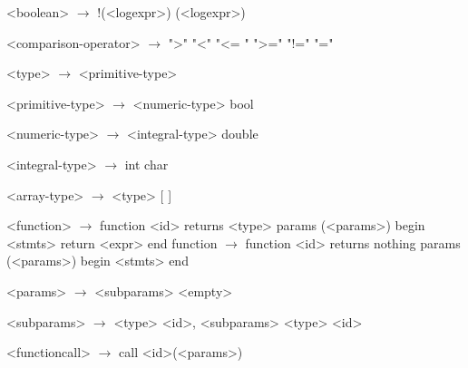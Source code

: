 \documentclass{article}
\begin{document}
\begin{grammar}
<boolean> $\rightarrow$ !(<logexpr>)
		\alt (<logexpr>)

<comparison-operator> $\rightarrow$ ">"
				\alt "<"
				\alt "<= "
				\alt ">="
				\alt "!="
				\alt "="

<type> $\rightarrow$ <primitive-type>

<primitive-type> $\rightarrow$ <numeric-type>
\alt bool

<numeric-type> $\rightarrow$ <integral-type>
\alt double

<integral-type> $\rightarrow$ int
\alt char

<array-type> $\rightarrow$ <type> [ ]

<function> $\rightarrow$  function <id> returns <type> params (<params>)
begin
	<stmts>
	return <expr>
end
\alt function $\rightarrow$ function <id> returns nothing params (<params>)
begin
	<stmts>
end

<params> $\rightarrow$ <subparams>
	\alt <empty>

<subparams> $\rightarrow$ <type> <id>, <subparams>
\alt <type> <id>

<functioncall> $\rightarrow$ call <id>(<params>)

\end{grammar}
\end{document}
